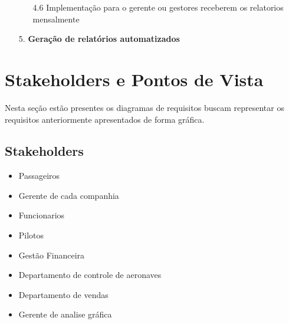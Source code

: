\begin{enumerate}
{\begin{enumerate}
            \item[4.6] Implementação para o gerente ou gestores receberem os relatorios mensalmente\\
          \end{enumerate}
        }
  \item[5.] \textbf{Geração de relatórios automatizados}
\end{enumerate}




\section{Stakeholders e Pontos de Vista}
Nesta seção estão presentes os diagramas de requisitos 
buscam representar os requisitos anteriormente apresentados de forma gráfica.

\subsection{Stakeholders}


\begin{itemize}
  \item Passageiros
  \item Gerente de cada companhia
  \item Funcionarios 
  \item Pilotos
  \item Gestão Financeira
  \item Departamento de controle de aeronaves
  \item Departamento de vendas
  \item Gerente de analise gráfica \\
\end{itemize}





